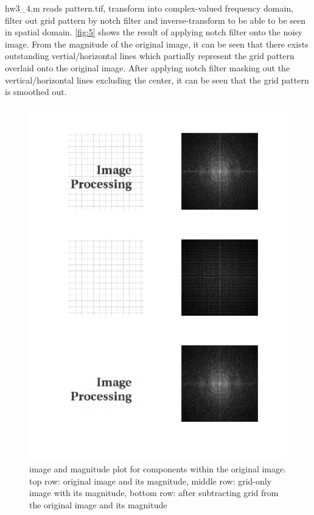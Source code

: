 \documentclass[extendedabs]{bmvc2k}
\begin{document}
hw3\_4.m reads pattern.tif, transform into complex-valued frequency domain, filter out grid pattern
by notch filter and inverse-transform to be able to be seen in spatial domain. 
\figurename{\ref{fig:5}} shows the result of applying notch filter onto the noisy image.
From the magnitude of the original image, it can be seen that there exists outstanding
vertial/horizontal lines which partially represent the grid pattern overlaid onto the original
image. After applying notch filter masking out the vertical/horizontal lines excluding the center,
it can be seen that the grid pattern is smoothed out.

\begin{figure}[h]
    \centering
    \includegraphics[width=\linewidth]{hw3_4_2}
    \caption{image and magnitude plot for components within the original image. top row: original image
    and its magnitude, middle row: grid-only image with its magnitude, bottom row: after
    subtracting grid from the original image and its magnitude}
    \label{fig:6}
\end{figure}
\end{document}
